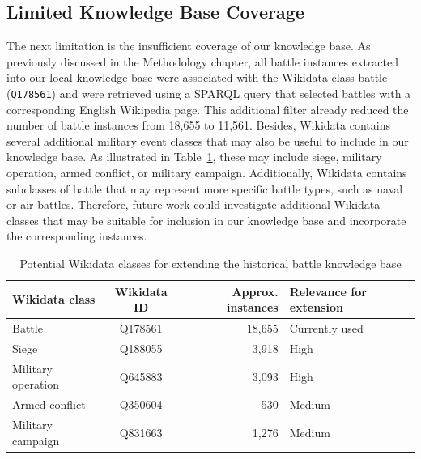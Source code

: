 \subsection{Limited Knowledge Base Coverage}
The next limitation is the insufficient coverage of our knowledge base. As previously discussed in the Methodology chapter, all battle instances extracted into our local knowledge base were associated with the Wikidata class battle (\texttt{Q178561}) and were retrieved using a SPARQL query that selected battles with a corresponding English Wikipedia page. This additional filter already reduced the number of battle instances from 18,655 to 11,561. Besides, Wikidata contains several additional military event classes that may also be useful to include in our knowledge base. As illustrated in Table~\ref{tab:wikidata_extension_classes}, these may include siege, military operation, armed conflict, or military campaign. Additionally, Wikidata contains subclasses of battle that may represent more specific battle types, such as naval or air battles. Therefore, future work could investigate additional Wikidata classes that may be suitable for inclusion in our knowledge base and incorporate the corresponding instances.
\begin{table}[H]
    \centering
    \caption{Potential Wikidata classes for extending the historical battle knowledge base}
    \label{tab:wikidata_extension_classes}

    \small
    \renewcommand{\arraystretch}{1.5}
    \setlength{\tabcolsep}{8pt}

    \begin{tabular}{l c r l}
        \toprule
        \textbf{Wikidata class} &
        \textbf{Wikidata ID} &
        \textbf{Approx. instances} &
        \textbf{Relevance for extension} \\
        \midrule

        Battle &
        Q178561 &
        18,655 &
        Currently used \\

        Siege &
        Q188055 &
        3,918 &
        High \\

        Military operation &
        Q645883 &
        3,093 &
        High \\

        Armed conflict &
        Q350604 &
        530 &
        Medium \\

        Military campaign &
        Q831663 &
        1,276 &
        Medium \\

        \bottomrule
    \end{tabular}
\end{table}
